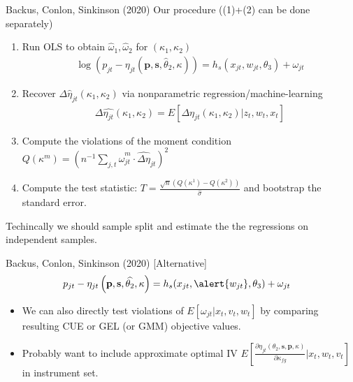 \documentclass[xcolor=pdftex,dvipsnames,table,mathserif,aspectratio=169]{beamer}
\begin{document}
\begin{frame}{Backus, Conlon, Sinkinson (2020)}
\footnotesize
Our procedure ((1)+(2) can be done separately)
\begin{enumerate}
\item Run OLS to obtain $\widehat{\omega}_1,\widehat{\omega}_2$ for $(\kappa_1,\kappa_2)$
\begin{align*}
\log \left( p_{jt} - \eta_{jt}(\mathbf{p},\mathbf{s},\widehat{\theta}_2,\kappa) \right) = h_s(x_{jt}, w_{jt},\theta_3) + \omega_{jt}
\end{align*}
\item Recover $\Delta \widehat{\eta}_{jt}(\kappa_1,\kappa_2)$ via nonparametric regression/machine-learning
\begin{align*}
\Delta \widehat{\eta_{jt}}(\kappa_1,\kappa_2) = E \left[\Delta \eta_{jt}(\kappa_1,\kappa_2) | z_{t},w_{t},x_{t} \right]
\end{align*}
\item Compute the violations of the moment condition
$Q\left(\kappa^{m}\right)=\left(n^{-1} \sum_{j, t} \hat{\omega}_{j t}^{m} \cdot \widehat{\Delta \eta}_{j t}\right)^{2}$
\item Compute the test statistic: $T=\frac{\sqrt{n}\left(Q\left(\kappa^{1}\right)-Q\left(\kappa^{2}\right)\right)}{\hat{\sigma}}$ and bootstrap the standard error.
\end{enumerate}
Techincally we should \alert{sample split} and estimate the the regressions on \alert{independent} samples.
\end{frame}


\begin{frame}{Backus, Conlon, Sinkinson (2020) [Alternative]}
\begin{align*}
 p_{jt} -\eta_{jt}\left(\mathbf{p},\mathbf{s},\widehat{\theta_2},\kappa \right)&= h_s(x_{jt}, \alert{w_{jt}},\theta_3) +  \omega_{jt}
\end{align*}
\begin{itemize}
\item We can also directly test violations of $E[\omega_{jt} | x_t, v_t, w_t]$ by comparing resulting CUE or GEL (or GMM) objective values.
\item Probably want to include approximate optimal IV $E\left[\frac{\partial \eta_{jt}(\theta_2,\mathbf{s},\mathbf{p},\kappa)}{\partial \kappa_{fg}} | x_{t}, w_{t}, v_{t}\right]$ in instrument set.
\end{itemize}
\end{frame}
\end{document}
